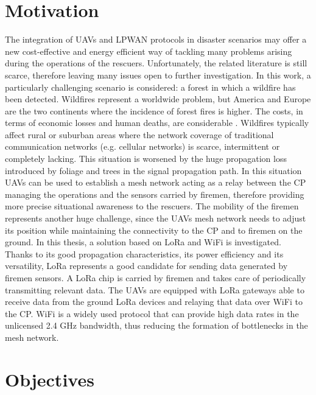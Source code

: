 \section{Motivation}
\label{sec:motivation}

The integration of \glspl{UAV} and \gls{LPWAN} protocols in disaster scenarios may offer a new cost-effective and energy efficient way of tackling many problems arising during the operations of the rescuers. Unfortunately, the related literature is still scarce, therefore leaving many issues open to further investigation. In this work, a particularly challenging scenario is considered: a forest in which a wildfire has been detected.
Wildfires represent a worldwide problem, but America and Europe are the two continents where the incidence of forest fires is higher. The costs, in terms of economic losses and human deaths, are considerable \cite{ref:disasters-report} \cite{ref:wildfires-figures}.
Wildfires typically affect rural or suburban areas where the network coverage of traditional communication networks (e.g. cellular networks) is scarce, intermittent or completely lacking. This situation is worsened by the huge propagation loss introduced by foliage and trees in the signal propagation path. In this situation \glspl{UAV} can be used to establish a mesh network acting as a relay between the \gls{CP} managing the operations and the sensors carried by firemen, therefore providing more precise situational awareness to the rescuers. The mobility of the firemen represents another huge challenge, since the \glspl{UAV} mesh network needs to adjust its position while maintaining the connectivity to the \gls{CP} and to firemen on the ground. 
In this thesis, a solution based on LoRa and WiFi is investigated. Thanks to its good propagation characteristics, its power efficiency and its versatility, LoRa represents a good candidate for sending data generated by firemen sensors. A LoRa chip is carried by firemen and takes care of periodically transmitting relevant data. The \glspl{UAV} are equipped with LoRa gateways able to receive data from the ground LoRa devices and relaying that data over WiFi to the \gls{CP}. WiFi is a widely used protocol that can provide high data rates in the unlicensed 2.4 GHz bandwidth, thus reducing the formation of bottlenecks in the mesh network.

\section{Objectives}

